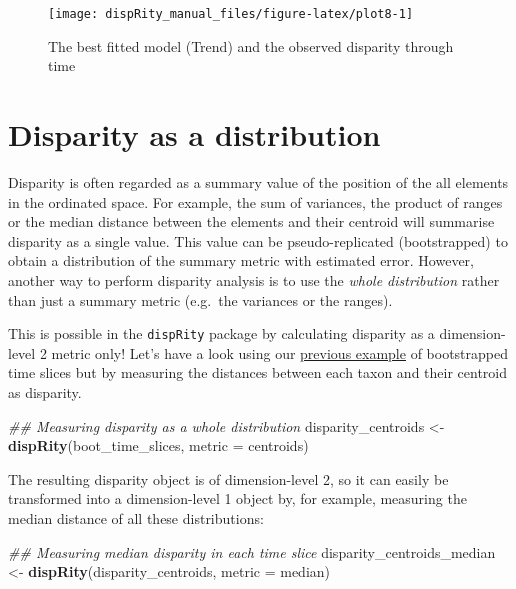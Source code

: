 \documentclass[]{book}
\newenvironment{Shaded}{\begin{snugshade}}{\end{snugshade}}
\newcommand{\CommentTok}[1]{\textcolor[rgb]{0.56,0.35,0.01}{\textit{#1}}}
\newcommand{\DataTypeTok}[1]{\textcolor[rgb]{0.13,0.29,0.53}{#1}}
\newcommand{\KeywordTok}[1]{\textcolor[rgb]{0.13,0.29,0.53}{\textbf{#1}}}
\newcommand{\NormalTok}[1]{#1}
\newcommand{\StringTok}[1]{\textcolor[rgb]{0.31,0.60,0.02}{#1}}
\begin{document}
\begin{figure}

{\centering \texttt{[image: dispRity\_manual\_files/figure-latex/plot8-1]} 

}

\caption{The best fitted model (Trend) and the observed disparity through time}\label{fig:plot8}
\end{figure}

\hypertarget{disparity-distribution}{%
\section{Disparity as a distribution}\label{disparity-distribution}}

Disparity is often regarded as a summary value of the position of the all elements in the ordinated space.
For example, the sum of variances, the product of ranges or the median distance between the elements and their centroid will summarise disparity as a single value.
This value can be pseudo-replicated (bootstrapped) to obtain a distribution of the summary metric with estimated error.
However, another way to perform disparity analysis is to use the \emph{whole distribution} rather than just a summary metric (e.g.~the variances or the ranges).

This is possible in the \texttt{dispRity} package by calculating disparity as a dimension-level 2 metric only!
Let's have a look using our \protect\hyperlink{summarising-dispRity-data-plots}{previous example} of bootstrapped time slices but by measuring the distances between each taxon and their centroid as disparity.

\begin{Shaded}
\begin{Highlighting}[]
\CommentTok{## Measuring disparity as a whole distribution}
\NormalTok{disparity_centroids <-}\StringTok{ }\KeywordTok{dispRity}\NormalTok{(boot_time_slices, }
                                \DataTypeTok{metric =}\NormalTok{ centroids)}
\end{Highlighting}
\end{Shaded}

The resulting disparity object is of dimension-level 2, so it can easily be transformed into a dimension-level 1 object by, for example, measuring the median distance of all these distributions:

\begin{Shaded}
\begin{Highlighting}[]
\CommentTok{## Measuring median disparity in each time slice}
\NormalTok{disparity_centroids_median <-}\StringTok{ }\KeywordTok{dispRity}\NormalTok{(disparity_centroids,}
                                       \DataTypeTok{metric =}\NormalTok{ median)}
\end{Highlighting}
\end{Shaded}
\end{document}
